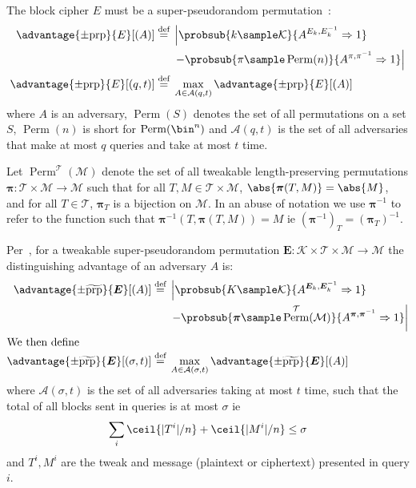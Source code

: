 \documentclass[letterpaper,11pt]{article}
\newcommand*{\defeq}{\stackrel{\text{def}}{=}}
\DeclareMathOperator{\Perm}{Perm}
\begin{document}
The block cipher
$E$
must be a super-pseudorandom permutation~\cite{concsym}:
%
\begin{align*}
    \advantage{\pm \mathrm{prp}}{E}[(A)] \defeq
    {}&\left\lvert\probsub{k \sample \mathcal{K}}{A^{E_k,E_k^{-1}}\Rightarrow 1}\right.
    \\
    {}&\left. - \probsub{\pi \sample \Perm(n)}{A^{\pi,\pi^{-1}}\Rightarrow 1}\right\rvert
    \\
    \advantage{\pm \mathrm{prp}}{E}[(q, t)] \defeq
    {}&\max_{A \in \mathcal{A}(q, t)} \advantage{\pm \mathrm{prp}}{E}[(A)]
\end{align*}
%
where $A$ is an adversary,
$\Perm(S)$ denotes the set of all permutations on a set $S$,
$\Perm(n)$ is short for $\Perm(\bin^n)$
and
$\mathcal{A}(q, t)$
is the set of all adversaries that make at most $q$ queries and take at most $t$ time.

Let $\Perm^\mathcal{T}(\mathcal{M})$
denote the set of all
tweakable length-preserving permutations
$\bm{\pi} : \mathcal{T} \times \mathcal{M} \rightarrow \mathcal{M}$
such that for all $T, M \in \mathcal{T} \times \mathcal{M}$,
$\abs{\bm{\pi}(T, M)} = \abs{M}$, and
for all $T \in \mathcal{T}$, $\bm{\pi}_{T}$ is a bijection on \(\mathcal{M}\).
In an abuse of notation
we use $\bm{\pi}^{-1}$ to refer to the function
such that $\bm{\pi}^{-1}(T, \bm{\pi}(T, M)) = M$ ie $(\bm{\pi}^{-1})_T = (\bm{\pi}_T)^{-1}$.

Per~\cite{cmc}, for a tweakable super-pseudorandom permutation
$\bm{E} : \mathcal{K} \times \mathcal{T} \times \mathcal{M} \rightarrow \mathcal{M}$
the distinguishing advantage of an adversary $A$ is:
%
\begin{align*}
    \advantage{\pm \widetilde{\mathrm{prp}}}{\bm{E}}[(A)] \defeq
    {}&\left\lvert\probsub{K \sample \mathcal{K}}{A^{\bm{E}_k,\bm{E}_k^{-1}}\Rightarrow 1}\right.
    \\
    {}&\left. - \probsub{\bm{\pi} \sample \Perm^\mathcal{T}(\mathcal{M})}
        {A^{\bm{\pi},\bm{\pi}^{-1}}\Rightarrow 1}\right\rvert
    \\
    \intertext{We then define}
    \advantage{\pm \widetilde{\mathrm{prp}}}{\bm{E}}[(\sigma, t)]
    \defeq {}&
    \max_{A \in \mathcal{A}(\sigma, t)} \advantage{\pm \widetilde{\mathrm{prp}}}{\bm{E}}[(A)]
\end{align*}
where \(\mathcal{A}(\sigma, t)\)
is the set of all adversaries taking at most \(t\) time,
such that the total of all blocks sent in queries is
at most \(\sigma\) ie
\begin{displaymath}
    \sum_i \ceil{|T^i|/n} + \ceil{|M^i|/n} \leq \sigma
\end{displaymath}
and \(T^i, M^i\) are the tweak and message
(plaintext or ciphertext)
presented in query \(i\).
\end{document}

